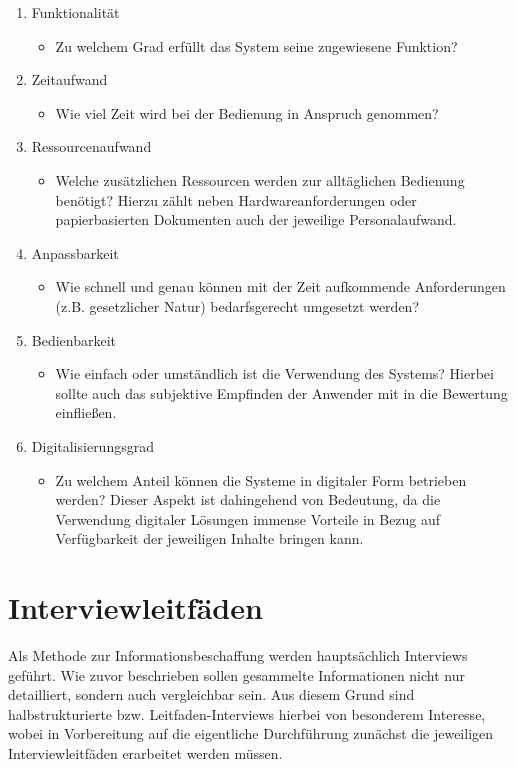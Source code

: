 \begin{enumerate}
	\item Funktionalität
	\begin{itemize}
		\item[] Zu welchem Grad erfüllt das System seine zugewiesene Funktion?
	\end{itemize}
	\item Zeitaufwand
	\begin{itemize}
		\item[] Wie viel Zeit wird bei der Bedienung in Anspruch genommen?
	\end{itemize}
	\item Ressourcenaufwand
	\begin{itemize}
		\item[] Welche zusätzlichen Ressourcen werden zur alltäglichen Bedienung benötigt? Hierzu zählt neben Hardwareanforderungen oder papierbasierten Dokumenten auch der jeweilige Personalaufwand.
	\end{itemize}
	\item Anpassbarkeit
	\begin{itemize}
		\item[] Wie schnell und genau können mit der Zeit aufkommende Anforderungen (z.B. gesetzlicher Natur) bedarfsgerecht umgesetzt werden?
	\end{itemize}
	\item Bedienbarkeit
	\begin{itemize}
		\item[] Wie einfach oder umständlich ist die Verwendung des Systems? Hierbei sollte auch das subjektive Empfinden der Anwender mit in die Bewertung einfließen.
	\end{itemize}
	\item Digitalisierungsgrad
	\begin{itemize}
		\item[] Zu welchem Anteil können die Systeme in digitaler Form betrieben werden? Dieser Aspekt ist dahingehend von Bedeutung, da die Verwendung digitaler Lösungen immense Vorteile in Bezug auf Verfügbarkeit der jeweiligen Inhalte bringen kann.
	\end{itemize}
\end{enumerate}


\section{Interviewleitfäden}

Als Methode zur Informationsbeschaffung werden hauptsächlich Interviews geführt. Wie zuvor beschrieben sollen gesammelte Informationen nicht nur detailliert, sondern auch vergleichbar sein. Aus diesem Grund sind halbstrukturierte bzw. Leitfaden-Interviews hierbei von besonderem Interesse, wobei in Vorbereitung auf die eigentliche Durchführung zunächst die jeweiligen Interviewleitfäden erarbeitet werden müssen.

